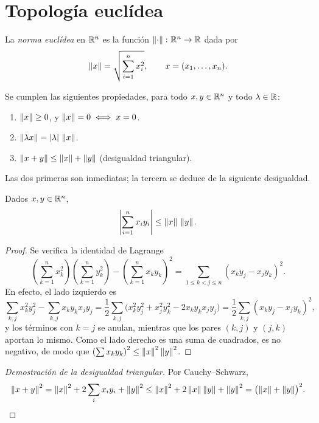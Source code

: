 \section{Topología euclídea}

\begin{definition}
  La \emph{norma euclídea} en \(\mathbb{R}^n\) es la función \(\left\lVert \cdot \right\rVert\colon \mathbb{R}^n \to \mathbb{R}\) dada por
  \[
    \left\lVert x \right\rVert = \sqrt{\sum_{i=1}^{n} x_i^2}, \qquad x = (x_1, \dots, x_n).
  \]
\end{definition}

Se cumplen las siguientes propiedades, para todo \(x, y \in \mathbb{R}^n\) y todo \(\lambda \in \mathbb{R}\):
\begin{enumerate}[label=(\arabic*)]
  \item \(\left\lVert x \right\rVert \geq 0\), y \(\left\lVert x \right\rVert = 0 \iff x = 0\).
  \item \(\left\lVert \lambda x \right\rVert = |\lambda| \, \left\lVert x \right\rVert\).
  \item \(\left\lVert x + y \right\rVert \leq \left\lVert x \right\rVert + \left\lVert y \right\rVert\) (desigualdad triangular).
\end{enumerate}
Las dos primeras son inmediatas; la tercera se deduce de la siguiente desigualdad.

\begin{prop}
  Dados \(x, y \in \mathbb{R}^n\),
  \[
    \left| \sum_{i=1}^{n} x_i y_i \right| \leq \left\lVert x \right\rVert \, \left\lVert y \right\rVert.
  \]
\end{prop}

\begin{proof}
  Se verifica la identidad de Lagrange
  \[
    \left( \sum_{k=1}^{n} x_k^2 \right) \left( \sum_{k=1}^{n} y_k^2 \right) - {\left( \sum_{k=1}^{n} x_k y_k \right)}^2 = \sum_{1 \leq k < j \leq n} {(x_k y_j - x_j y_k)}^2.
  \]
  En efecto, el lado izquierdo es
  \[
    \sum_{k, j} x_k^2 y_j^2 - \sum_{k, j} x_k y_k x_j y_j = \frac{1}{2} \sum_{k, j} \bigl( x_k^2 y_j^2 + x_j^2 y_k^2 - 2 x_k y_k x_j y_j \bigr) = \frac{1}{2} \sum_{k, j} {(x_k y_j - x_j y_k)}^2,
  \]
  y los términos con \(k = j\) se anulan, mientras que los pares \((k, j)\) y \((j, k)\) aportan lo mismo. Como el lado derecho es una suma de cuadrados, es no negativo, de modo que \({(\sum x_k y_k)}^2 \leq \left\lVert x \right\rVert^2 \left\lVert y \right\rVert^2\).
\end{proof}

\begin{proof}[Demostración de la desigualdad triangular]
  Por Cauchy--Schwarz,
  \[
    \left\lVert x + y \right\rVert^2 = \left\lVert x \right\rVert^2 + 2 \sum_i x_i y_i + \left\lVert y \right\rVert^2 \leq \left\lVert x \right\rVert^2 + 2 \left\lVert x \right\rVert \left\lVert y \right\rVert + \left\lVert y \right\rVert^2 = {\bigl( \left\lVert x \right\rVert + \left\lVert y \right\rVert \bigr)}^2. \qedhere
  \]
\end{proof}

